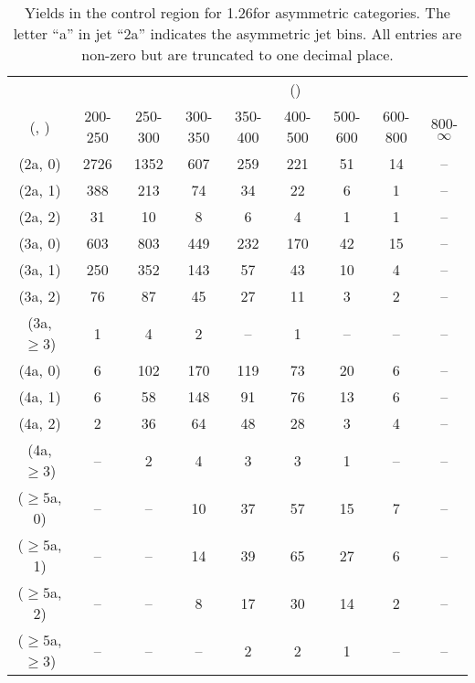 \begin{table}[h!]
\tiny
\centering
\caption{Yields in the \mj control region for 1.26\ifb for asymmetric categories. The letter ``a'' in jet \eg ``2a''  indicates the asymmetric jet bins. All entries are non-zero but are truncated to one decimal place.\label{tab:yieldssep_mu_data_asym}}
\begin{tabular}
{ccccccccc}
	\hline\hline
&	& \multicolumn{8}{c}{\scalht (\gev)} \\ 
	 (\njet,  \nb) & 200-250 & 250-300 & 300-350 & 350-400 & 400-500 & 500-600 & 600-800 & 800-$\infty$ \\ [0.8ex] 
\hline
	(2a, 0) & 2726 & 1352 & 607 & 259 & 221 & 51 & 14 & -- \\[0.5ex] 
	(2a, 1) & 388 & 213 & 74 & 34 & 22 & 6 & 1 & -- \\[0.5ex] 
	(2a, 2) & 31 & 10 & 8 & 6 & 4 & 1 & 1 & -- \\[0.5ex] 
	(3a, 0) & 603 & 803 & 449 & 232 & 170 & 42 & 15 & -- \\[0.5ex] 
	(3a, 1) & 250 & 352 & 143 & 57 & 43 & 10 & 4 & -- \\[0.5ex] 
	(3a, 2) & 76 & 87 & 45 & 27 & 11 & 3 & 2 & -- \\[0.5ex] 
	(3a, $\ge3$) & 1 & 4 & 2 & -- & 1 & -- & -- & -- \\[0.5ex] 
	(4a, 0) & 6 & 102 & 170 & 119 & 73 & 20 & 6 & -- \\[0.5ex] 
	(4a, 1) & 6 & 58 & 148 & 91 & 76 & 13 & 6 & -- \\[0.5ex] 
	(4a, 2) & 2 & 36 & 64 & 48 & 28 & 3 & 4 & -- \\[0.5ex] 
	(4a, $\ge3$) & -- & 2 & 4 & 3 & 3 & 1 & -- & -- \\[0.5ex] 
	($\ge5$a, 0) & -- & -- & 10 & 37 & 57 & 15 & 7 & -- \\[0.5ex] 
	($\ge5$a, 1) & -- & -- & 14 & 39 & 65 & 27 & 6 & -- \\[0.5ex] 
	($\ge5$a, 2) & -- & -- & 8 & 17 & 30 & 14 & 2 & -- \\[0.5ex] 
	($\ge5$a, $\ge3$) & -- & -- & -- & 2 & 2 & 1 & -- & -- \\[0.5ex] 
	\hline
	\hline
\end{tabular}
\end{table}
